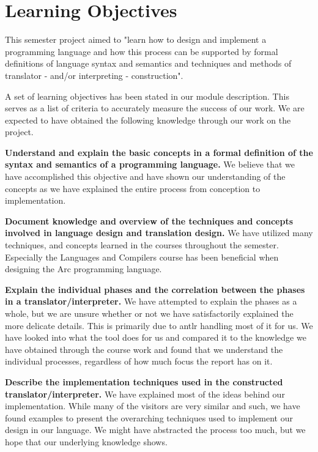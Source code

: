 \section{Learning Objectives}\label{sec:learning_objectives}

This semester project aimed to "learn how to design and implement a programming language and how this process can be supported by formal definitions of language syntax and semantics and techniques and methods of translator - and/or interpreting - construction".

A set of learning objectives has been stated in our module description. This serves as a list of criteria to accurately measure the success of our work. We are expected to have obtained the following knowledge through our work on the project.

\textbf{Understand and explain the basic concepts in a formal definition of the syntax and semantics of a programming language.} We believe that we have accomplished this objective and have shown our understanding of the concepts as we have explained the entire process from conception to implementation.

\textbf{Document knowledge and overview of the techniques and concepts involved in language design and translation design.} We have utilized many techniques, and concepts learned in the courses throughout the semester. Especially the Languages and Compilers course has been beneficial when designing the Arc programming language.

\textbf{Explain the individual phases and the correlation between the phases in a translator/interpreter.} We have attempted to explain the phases as a whole, but we are unsure whether or not we have satisfactorily explained the more delicate details. This is primarily due to \gls{antlr} handling most of it for us. We have looked into what the tool does for us and compared it to the knowledge we have obtained through the course work and found that we understand the individual processes, regardless of how much focus the report has on it.

\textbf{Describe the implementation techniques used in the constructed translator/interpreter.} We have explained most of the ideas behind our implementation. While many of the visitors are very similar and such, we have found examples to present the overarching techniques used to implement our design in our language. We might have abstracted the process too much, but we hope that our underlying knowledge shows.

